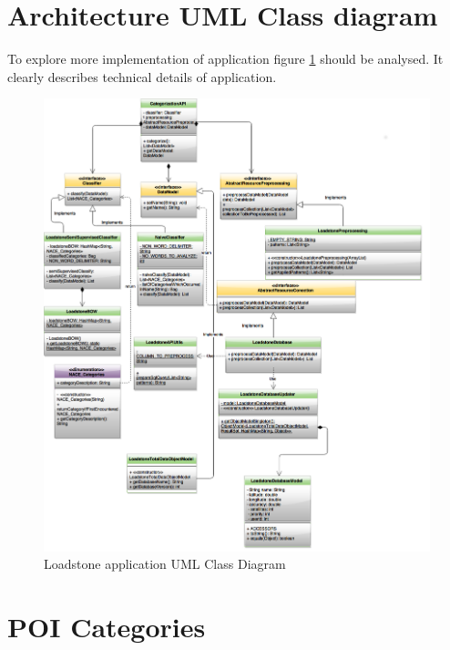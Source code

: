 \section{Architecture UML Class diagram}
To explore more implementation of application figure \ref{fig:@=loadstone_uml} should be analysed. It clearly describes technical details of application.
\begin{figure}
	\centering
	\includegraphics[scale=0.4]{UML.png}
	\caption{Loadstone application UML Class Diagram}
	\label{fig:@=loadstone_uml}
\end{figure}

\section{POI Categories}

